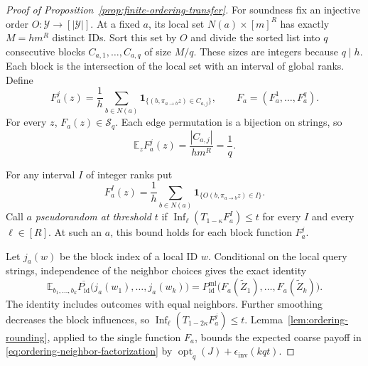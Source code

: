 \begin{proof}[Proof of Proposition~\ref{prop:finite-ordering-transfer}]
For soundness fix an injective order \(O:\mathcal Y\to[|\mathcal Y|]\).
At a fixed \(a\), its local set \(N(a)\times[m]^R\) has exactly
\(M=hm^R\) distinct IDs.  Sort this set by \(O\) and divide the sorted
list into \(q\) consecutive blocks \(C_{a,1},\ldots,C_{a,q}\) of
size \(M/q\).  These sizes are integers because \(q\mid h\).
Each block is the intersection of the local set with an interval of
global ranks.  Define
\begin{equation}
 F_a^j(z)=\frac1h\sum_{b\in N(a)}
  \mathbf1_{\{(b,\pi_{a\to b}z)\in C_{a,j}\}},
 \qquad F_a=(F_a^1,\ldots,F_a^q).
\label{eq:ordering-block-functions}
\end{equation}
For every \(z\), \(F_a(z)\in\mathcal S_q\).  Each edge permutation
is a bijection on strings, so
\begin{equation}
 \mathbb E_z F_a^j(z)=\frac{|C_{a,j}|}{hm^R}=\frac1q.
\label{eq:ordering-block-mass}
\end{equation}

For any interval \(I\) of integer ranks put
\[
 F_a^I(z)=\frac1h\sum_{b\in N(a)}
   \mathbf1_{\{O(b,\pi_{a\to b}z)\in I\}}.
\]
Call \(a\) \emph{pseudorandom at threshold \(t\)} if
\(\operatorname{Inf}_\ell(T_{1-\kappa}F_a^I)\le t\) for every
\(I\) and every \(\ell\in[R]\).  At such an \(a\), this bound holds
for each block function \(F_a^j\).

Let \(j_a(w)\) be the block index of a local ID \(w\).  Conditional
on the local query strings, independence of the neighbor choices
gives the exact identity
\begin{equation}
 \mathbb E_{b_1,\ldots,b_k}
 \overline{P_{\mathrm{id}}}\bigl(j_a(w_1),\ldots,j_a(w_k)\bigr)
 =
 P_{\mathrm{id}}^{\mathrm{ml}}\bigl(F_a(\widetilde Z_1),\ldots,
                         F_a(\widetilde Z_k)\bigr).
\label{eq:ordering-neighbor-factorization}
\end{equation}
The identity includes outcomes with equal neighbors.  Further
smoothing decreases the block influences, so
\(\operatorname{Inf}_\ell(T_{1-2\kappa}F_a^j)\le t\).
Lemma~\ref{lem:ordering-rounding}, applied to the single function
\(F_a\), bounds the expected coarse payoff in
\eqref{eq:ordering-neighbor-factorization} by
\(\operatorname{opt}_q(J)+\epsilon_{\mathrm{inv}}(kqt)\).


\end{proof}
